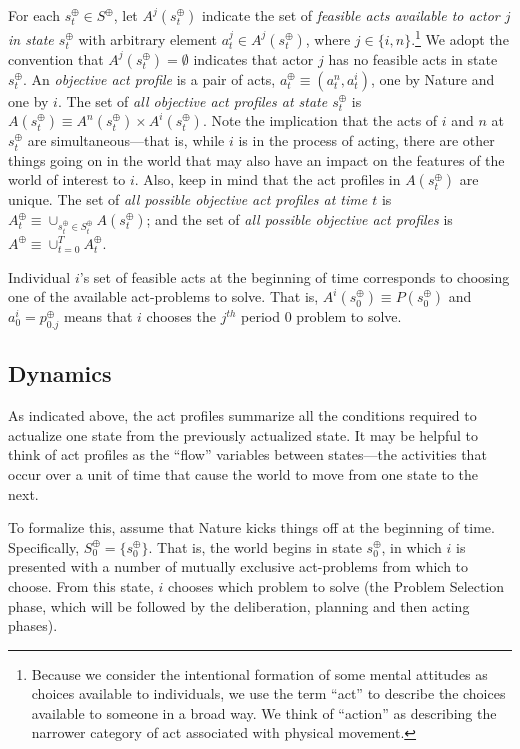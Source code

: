 \documentclass[
11pt,
titlepage,
reqno,
]{article}%
\theoremstyle{definition}
\begin{document}
For each  $s^\oplus_t\in S^\oplus$, let $A^j(s^\oplus_t)$ indicate the set of \textit{feasible acts available to actor $j$ in state $s^\oplus_t$} with arbitrary element $a^j_t\in A^j(s^\oplus_t)$, where $j\in\{i,n\}$.\footnote
{
	Because we consider the intentional formation of some mental attitudes as choices available to individuals, we use the term ``act'' to describe the choices available to someone in a broad way.
	We think of ``action'' as describing the narrower category of act associated with physical movement.
} 
We adopt the convention that $A^j(s^\oplus_t)=\emptyset$ indicates that actor $j$ has no feasible acts in state $s^\oplus_t$.
An \textit{objective act profile} is a pair of acts, $a^\oplus_t\equiv(a^n_t,a^i_t)$, one by Nature and one by $i$. 
The set of \textit{all objective act profiles at state $s^\oplus_t$} is $A(s^\oplus_t)\equiv A^n(s^\oplus_t)\times A^i(s^\oplus_t)$.
Note the implication that the acts of $i$ and $n$ at $s^\oplus_t$ are simultaneous---that is, while $i$ is in the process of acting, there are other things going on in the world that may also have an impact on the features of the world of interest to $i$.
Also, keep in mind that the act profiles in $A(s^\oplus_t)$ are unique.
The set of \textit{all possible objective act profiles at time $t$} is  $A^\oplus_t\equiv \cup_{s^\oplus_t\in S^\oplus_t} A(s^\oplus_t)$; and the set of \textit{all possible objective act profiles} is $A^\oplus\equiv \cup_{t=0}^{T} A^\oplus_t$. 

Individual $i$'s set of feasible acts at the beginning of time corresponds to choosing one of the available act-problems to solve. 
That is, $A^i(s^\oplus_0)\equiv P(s^\oplus_0)$ and $a^i_0=p^\oplus_{0.j}$ means that $i$ chooses the $j^{th}$ period $0$ problem to solve. 



\subsection{Dynamics} 

As indicated above, the act profiles summarize all the conditions required to actualize one state from the previously actualized state. 
It may be helpful to think of act profiles as the ``flow'' variables between states---the activities that occur over a unit of time that cause the world to move from one state to the next.

To formalize this, assume that Nature kicks things off at the beginning of time.
Specifically, $S^\oplus_0=\{s^\oplus_0\}$.
That is, the world begins in state $s^\oplus_0$, in which $i$ is presented with a number of mutually exclusive act-problems from which to choose.
From this state, $i$ chooses which problem to solve (the Problem Selection phase, which will be  followed by the deliberation, planning and then acting phases).
\end{document}
